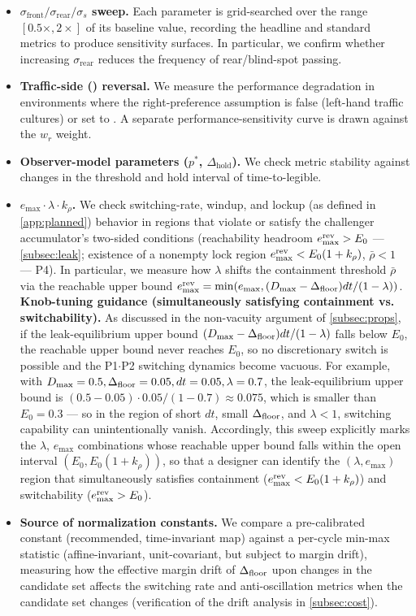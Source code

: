 \begin{itemize}
\item \textbf{$\sigma_{\text{front}}/\sigma_{\text{rear}}/\sigma_s$ sweep.} Each parameter is grid-searched over the range $[0.5\times, 2\times]$ of its baseline value, recording the headline and standard metrics to produce sensitivity surfaces. In particular, we confirm whether increasing $\sigma_{\text{rear}}$ reduces the frequency of rear/blind-spot passing.
\item \textbf{Traffic-side () reversal.} We measure the performance degradation in environments where the right-preference assumption is false (left-hand traffic cultures) or set to . A separate performance-sensitivity curve is drawn against the $w_r$ weight.
\item \textbf{Observer-model parameters ($p^*$, $\Delta_{\text{hold}}$).} We check metric stability against changes in the threshold and hold interval of time-to-legible.
\item \textbf{$e_{\max}\cdot\lambda\cdot k_\rho$.} We check switching-rate, windup, and lockup (as defined in \cref{app:planned}) behavior in regions that violate or satisfy the challenger accumulator's two-sided conditions (reachability headroom $e^{\text{rev}}_{\max} > E_0$ --- \cref{subsec:leak}; existence of a nonempty lock region $e^{\text{rev}}_{\max} < E_0(1+k_\rho)$, $\bar\rho < 1$ --- P4). In particular, we measure how $\lambda$ shifts the containment threshold $\bar\rho$ via the reachable upper bound $e^{\text{rev}}_{\max} = \min(e_{\max}, (D_{\max}-\Delta_{\text{floor}})dt/(1-\lambda))$. \textbf{Knob-tuning guidance (simultaneously satisfying containment vs. switchability).} As discussed in the non-vacuity argument of \cref{subsec:props}, if the leak-equilibrium upper bound $(D_{\max}-\Delta_{\text{floor}})dt/(1-\lambda)$ falls below $E_0$, the reachable upper bound never reaches $E_0$, so no discretionary switch is possible and the P1$\cdot$P2 switching dynamics become vacuous. For example, with $D_{\max}=0.5, \Delta_{\text{floor}}=0.05, dt=0.05, \lambda=0.7$, the leak-equilibrium upper bound is $(0.5-0.05)\cdot0.05/(1-0.7) \approx 0.075$, which is smaller than $E_0=0.3$ --- so in the region of short $dt$, small $\Delta_{\text{floor}}$, and $\lambda<1$, switching capability can unintentionally vanish. Accordingly, this sweep explicitly marks the $\lambda$, $e_{\max}$ combinations whose reachable upper bound falls within the open interval $(E_0, E_0(1+k_\rho))$, so that a designer can identify the $(\lambda, e_{\max})$ region that simultaneously satisfies containment ($e^{\text{rev}}_{\max} < E_0(1+k_\rho)$) and switchability ($e^{\text{rev}}_{\max} > E_0$).
\item \textbf{Source of normalization constants.} We compare a pre-calibrated constant (recommended, time-invariant map) against a per-cycle min-max statistic (affine-invariant, unit-covariant, but subject to margin drift), measuring how the effective margin drift of $\Delta_{\text{floor}}$ upon changes in the candidate set affects the switching rate and anti-oscillation metrics when the candidate set changes (verification of the drift analysis in \cref{subsec:cost}).
\end{itemize}

